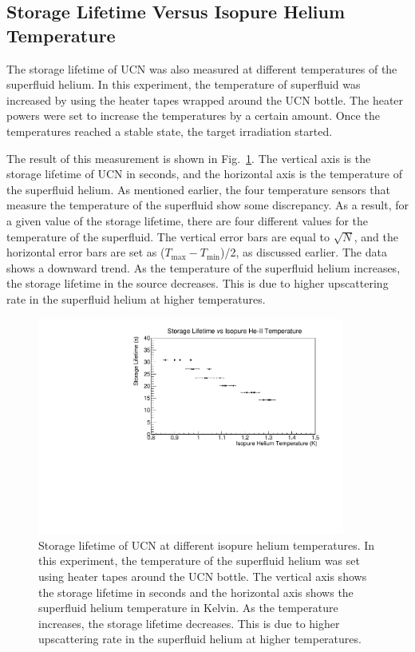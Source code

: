 \subsection{Storage Lifetime Versus Isopure Helium Temperature}
The storage lifetime of UCN was also measured at different
temperatures of the superfluid helium. In this experiment, the
temperature of superfluid was increased by using the heater tapes
wrapped around the UCN bottle. The heater powers were set to increase
the temperatures by a certain amount. Once the temperatures reached a
stable state, the target irradiation started.

The result of this measurement is shown in
Fig.~\ref{fig:storagelifetime_vs_temp}. The vertical axis is the
storage lifetime of UCN in seconds, and the horizontal axis is the
temperature of the superfluid helium. As mentioned earlier, the four
temperature sensors that measure the temperature of the superfluid
show some discrepancy. As a result, for a given value of the storage
lifetime, there are four different values for the temperature of the
superfluid. The vertical error bars are equal to $\sqrt{N}$, and the
horizontal error bars are set as
($T_{\mathrm{max}} - T_{\mathrm{min}}$)/2, as discussed earlier. The
data shows a downward trend. As the temperature of the superfluid
helium increases, the storage lifetime in the source decreases. This
is due to higher upscattering rate in the superfluid helium at
higher temperatures.


\begin{figure}[h!]
  \centering
  \includegraphics[width=0.9\textwidth]{StorageLifetime_vs_temp.pdf}
  \caption{Storage lifetime of UCN at different isopure helium
    temperatures. In this experiment, the temperature of the
    superfluid helium was set using heater tapes around the UCN
    bottle. The vertical axis shows the storage lifetime in seconds
    and the horizontal axis shows the superfluid helium temperature in
    Kelvin. As the temperature increases, the storage lifetime
    decreases. This is due to higher upscattering rate in the
    superfluid helium at higher temperatures.}
  \label{fig:storagelifetime_vs_temp}
\end{figure}



